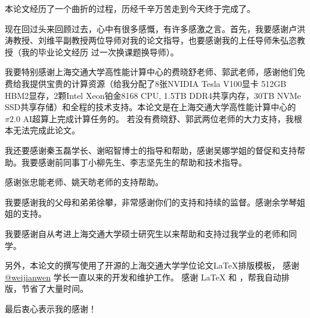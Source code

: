 
\begin{acknowledgements}
  本论文经历了一个曲折的过程，历经千辛万苦走到今天终于完成了。

  现在回过头来回顾过去，心中有很多感慨，有许多感激之言。首先，我要感谢卢洪涛教授、刘维平副教授两位导师对我的论文指导，也要感谢我的上任导师朱弘恣教授（我的毕业论文经历
  过一次换课题换导师）。

  我要特别感谢上海交通大学高性能计算中心的费晓舒老师、郭武老师，感谢他们免费给我提供宝贵的计算资源（给我分配了8张NVIDIA Tesla V100显卡 512GB HBM2显存，2颗Intel Xeon铂金8168 CPU, 
  1.5TB DDR4共享内存，30TB NVMe SSD共享存储）和全程的技术支持。本论文是在上海交通大学高性能计算中心的$\pi 2.0$ AI超算上完成计算任务的。
  若没有费晓舒、郭武两位老师的大力支持，我根本无法完成此论文。

  我还要感谢秦玉磊学长、谢昭智博士的指导和帮助，感谢吴娜学姐的督促和支持帮助。我要感谢前同事丁小柳先生、李志坚先生的帮助和技术指导。

  感谢张忠能老师、姚天昉老师的支持帮助。

  我要感谢我的父母和弟弟徐攀，非常感谢你们的支持和持续的监督。感谢余学琴姐姐的支持。

  我要感谢自从考进上海交通大学硕士研究生以来帮助和支持过我学业的老师和同学。

  另外，本论文的撰写使用了开源的\href{https://github.com/sjtug/SJTUThesis}{\sjtuthesis}上海交通大学学位论文\LaTeX{}排版模板， 
  感谢 \href{https://github.com/weijianwen}{@weijianwen} 学长一直以来的开发和维护工作。
  感谢 \LaTeX{} 和 \href{https://github.com/sjtug/SJTUThesis}{\sjtuthesis}，帮我自动排版，节省了大量时间。

  最后衷心表示我的感谢！


\end{acknowledgements}
